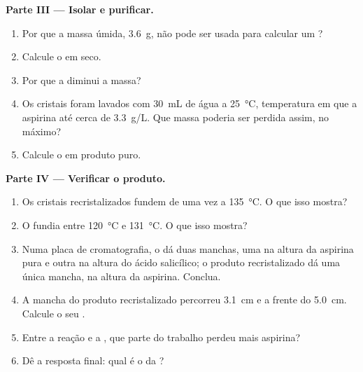 \begin{problem}
\medskip
\noindent\textbf{Parte III --- Isolar e purificar.}
\begin{enumerate}[resume]
  \item Por que a massa úmida, \qty{3.6}{g}, não pode ser usada para
        calcular um ?
  \item Calcule o  em  seco.
  \item Por que a  diminui a massa?
  \item Os cristais foram lavados com \qty{30}{mL} de água a
        \qty{25}{\celsius}, temperatura em que a aspirina  até
        cerca de \qty{3.3}{g/L}. Que massa poderia ser perdida assim, no
        máximo?
  \item Calcule o  em produto puro.
\end{enumerate}

\medskip
\noindent\textbf{Parte IV --- Verificar o produto.}
\begin{enumerate}[resume]
  \item Os cristais recristalizados fundem de uma vez a
        \qty{135}{\celsius}. O que isso mostra?
  \item O  fundia entre \qty{120}{\celsius} e
        \qty{131}{\celsius}. O que isso mostra?
  \item Numa placa de cromatografia, o  dá duas manchas,
        uma na altura da aspirina pura e outra na altura do ácido
        salicílico; o produto recristalizado dá uma única mancha, na
        altura da aspirina. Conclua.
  \item A mancha do produto recristalizado percorreu \qty{3.1}{cm} e a
        frente do  \qty{5.0}{cm}. Calcule o seu .
  \item Entre a reação e a , que parte do trabalho perdeu
        mais aspirina?
  \item Dê a resposta final: qual é o  da ?
\end{enumerate}
\end{problem}
